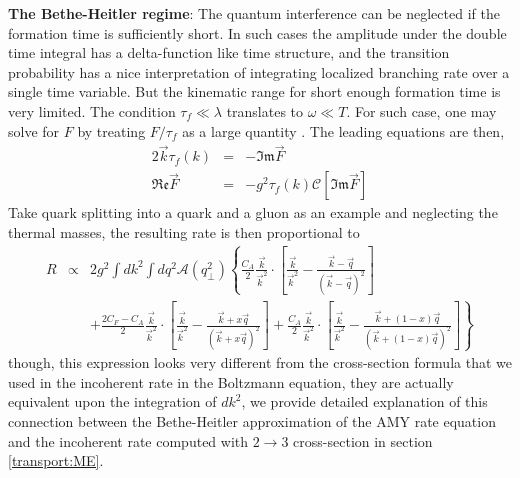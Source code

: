{\bf The Bethe-Heitler regime}: The quantum interference can be neglected if the formation time is sufficiently short.
In such cases the amplitude under the double time integral has a delta-function like time structure, and the transition probability has a nice interpretation of integrating localized branching rate over a single time variable.
But the kinematic range for short enough formation time is very limited. 
The condition $\tau_f \ll \lambda$ translates to $\omega \ll T$.
For such case, one may solve for $F$ by treating $F/\tau_f$ as a large quantity \cite{Ghiglieri:2015ala}.
The leading equations are then,
\begin{eqnarray}
2\vec{k}\tau_f(k) &=& - \mathfrak{Im} \vec{F} \\
\mathfrak{Re} \vec{F} &=& -g^2 \tau_f(k)\mathcal{C}[\mathfrak{Im} \vec{F}] 
\end{eqnarray}
Take quark splitting into a quark and a gluon as an example and neglecting the thermal masses, the resulting rate is then proportional to 
\begin{eqnarray}
R &\propto& 2g^2 \int d k^2 \int d q^2 \mathcal{A}(q_\perp^2) \left\{
\frac{C_A}{2} \frac{\vec{k}}{\vec{k}^2}\cdot\left[\frac{\vec{k}}{\vec{k}^2}-\frac{\vec{k}-\vec{q}}{(\vec{k}-\vec{q})^2}\right] \right.\\\nonumber
&&+\left. \frac{2C_F-C_A}{2} \frac{\vec{k}}{\vec{k}^2}\cdot\left[\frac{\vec{k}}{\vec{k}^2}-\frac{\vec{k}+x\vec{q}}{(\vec{k}+x\vec{q})^2}\right]
+\frac{C_A}{2} \frac{\vec{k}}{\vec{k}^2}\cdot\left[\frac{\vec{k}}{\vec{k}^2}-\frac{\vec{k}+(1-x)\vec{q}}{(\vec{k}+(1-x)\vec{q})^2}\right]
\right\}
\end{eqnarray}
though, this expression looks very different from the cross-section formula that we used in the incoherent rate in the Boltzmann equation, they are actually equivalent upon the integration of $dk^2$, we provide detailed explanation of this connection between the Bethe-Heitler approximation of the AMY rate equation and the incoherent rate computed with $2\rightarrow 3$ cross-section in section \ref{transport:ME}.

